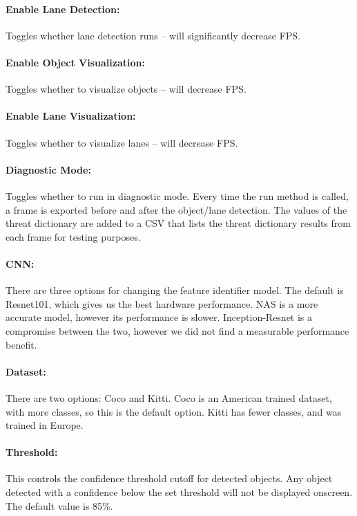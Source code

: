 \paragraph{Enable Lane Detection:} Toggles whether lane detection runs -- will significantly decrease FPS.

\paragraph{Enable Object Visualization:} Toggles whether to visualize objects -- will decrease FPS.

\paragraph{Enable Lane Visualization:} Toggles whether to visualize lanes -- will decrease FPS.

\paragraph{Diagnostic Mode:} Toggles whether to run in diagnostic mode. Every time the run method is called, a frame is exported before and after the object/lane detection. The values of the threat dictionary are added to a CSV that lists the threat dictionary results from each frame for testing purposes.

\paragraph{CNN:} There are three options for changing the feature identifier model. The default is Resnet101, which gives us the best hardware performance. NAS is a more accurate model, however its performance is slower. Inception-Resnet is a compromise between the two, however we did not find a measurable performance benefit.

\paragraph{Dataset:}There are two options: Coco and Kitti. Coco is an American trained dataset, with more classes, so this is the default option. Kitti has fewer classes, and was trained in Europe.

\paragraph{Threshold:} This controls the confidence threshold cutoff for detected objects. Any object detected with a confidence below the set threshold will not be displayed onscreen. The default value is 85\%.


